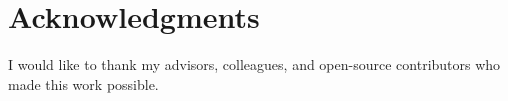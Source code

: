 \cleardoublepage
{}
\chapter*{Acknowledgments}

I would like to thank my advisors, colleagues, and open-source contributors who made this work possible.